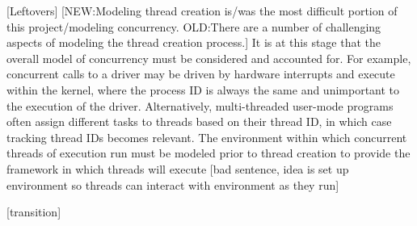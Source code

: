[Leftovers]
[NEW:Modeling thread creation is/was the most difficult portion of
this project/modeling concurrency.  OLD:There are a number of
challenging aspects of modeling the thread creation process.]  It is
at this stage that the overall model of 
concurrency must be considered and accounted for.  For example,
concurrent calls to a driver may be driven by hardware interrupts and
execute within the kernel, where the process ID is always the same and
unimportant to the execution of the driver.  Alternatively,
multi-threaded user-mode programs often assign different tasks to
threads based on their thread ID, in which case tracking thread IDs
becomes relevant.  The environment within which concurrent threads of
execution run must be modeled prior to thread creation to provide the
framework in which threads will execute [bad sentence, idea is set up
environment so threads can interact with environment as they run] 

[transition]


